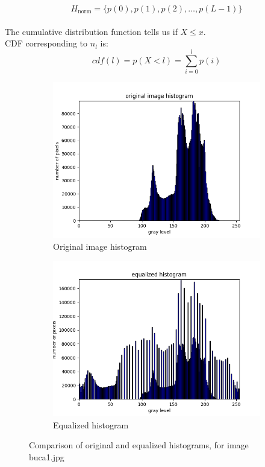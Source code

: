\documentclass[10pt]{article}
\begin{document}
\begin{equation*}
    H_{\text{norm}} = \{p(0), p(1), p(2), \ldots, p(L - 1)\}
\end{equation*}
\\
The cumulative distribution function tells us if $X \le x$.\\
CDF corresponding to $n_l$ is:
\begin{equation*}
    cdf(l) = p(X < l) = \sum_{i=0}^{l} p(i)
\end{equation*}


\begin{figure}[ht]
  \centering
  \begin{subfigure}[b]{0.4\textwidth}
    \includegraphics[width=\textwidth]{images/buca-h.png}
    \caption{Original image histogram}
    \label{fig:original-histogram}
  \end{subfigure}
  \begin{subfigure}[b]{0.4\textwidth}
    \includegraphics[width=\textwidth]{images/buca-e.png}
    \caption{Equalized histogram}
    \label{fig:equalized-histogram}
  \end{subfigure}
  \caption{Comparison of original and equalized histograms, for image buca1.jpg}
\end{figure}
\end{document}
